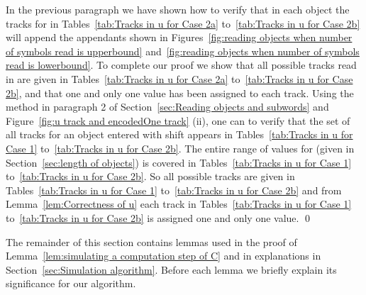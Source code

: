 \documentclass[11pt]{article} \usepackage{amsfonts,amsmath,amssymb,amsthm}
\renewenvironment{proof}{{\bfseries\noindent Proof.}}{\qed\vspace{3.5ex}}
\begin{document}
\begin{proof}
In the previous paragraph we have shown how to verify that in each object the tracks for  in Tables~\ref{tab:Tracks in u for Case 2a} to~\ref{tab:Tracks in u for Case 2b} will append the appendants shown in Figures~\ref{fig:reading objects when number of symbols read is upperbound} and~\ref{fig:reading objects when number of symbols read is lowerbound}. 
To complete our proof we show that all possible tracks read in  are given in Tables~\ref{tab:Tracks in u for Case 2a} to~\ref{tab:Tracks in u for Case 2b}, and that one and only one value has been assigned to each track.
Using the method in paragraph 2 of Section~\ref{sec:Reading objects and  subwords} and Figure~\ref{fig:u track and encodedOne track} (ii),
one can to verify that the set of all tracks for an object entered with shift  appears in Tables~\ref{tab:Tracks in u for Case 1} to~\ref{tab:Tracks in u for Case 2b}.
The entire range of values for  (given in  Section~\ref{sec:length of objects}) is covered in Tables~\ref{tab:Tracks in u for Case 1} to~\ref{tab:Tracks in u for Case 2b}.
So all possible  tracks are given in Tables~\ref{tab:Tracks in u for Case 1} to~\ref{tab:Tracks in u for Case 2b} and from Lemma~\ref{lem:Correctness of u} each  track in Tables~\ref{tab:Tracks in u for Case 1} to~\ref{tab:Tracks in u for Case 2b} is assigned one and only one value. 
\end{proof} 

The remainder of this section contains lemmas used in the proof of 
Lemma~\ref{lem:simulating a computation step of C} and in explanations in Section~\ref{sec:Simulation algorithm}. Before each lemma we briefly explain its significance for our algorithm.
\end{document}

